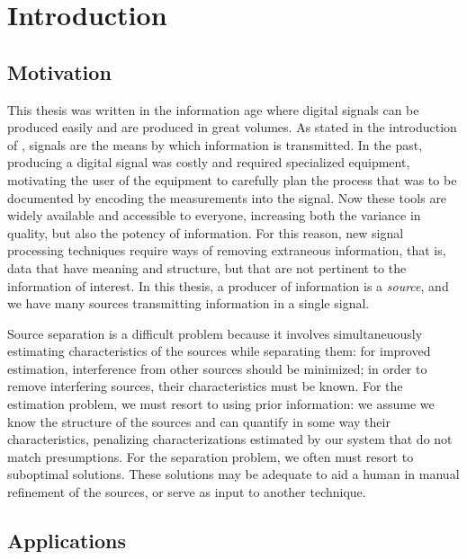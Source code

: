 \chapter{Introduction \label{chap:intro}}

\section{Motivation}

This thesis was written in the information age where digital signals can be
produced easily and are produced in great volumes. As stated in the introduction
of \cite{hayes2009statistical}, signals are the means by which information is
transmitted. In the past, producing a digital signal was costly and required
specialized equipment, motivating the user of the equipment to carefully plan
the process that was to be documented by encoding the measurements into the
signal. Now these tools are widely available and accessible to everyone,
increasing both the variance in quality, but also the potency of information.
For this reason, new signal processing techniques require ways of removing
extraneous information, that is, data that have meaning and structure, but that
are not pertinent to the information of interest. In this thesis, a producer of
information is a \textit{source}, and we have many sources transmitting
information in a single signal. 

Source separation is a difficult problem because it involves simultaneuously
estimating characteristics of the sources while separating them: for improved
estimation, interference from other sources should be minimized; in order to
remove interfering sources, their characteristics must be known. For the
estimation problem, we must resort to using prior information: we assume we
know the structure of the sources and can quantify in some way their
characteristics, penalizing characterizations estimated by our system that do
not match presumptions. For the separation problem, we often must resort to
suboptimal solutions. These solutions may be adequate to aid a human in manual
refinement of the sources, or serve as input to another technique.

\section{Applications}

